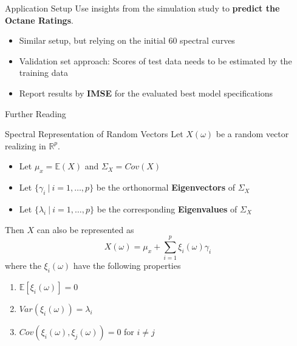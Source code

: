 \documentclass{beamer}
\begin{document}
	\begin{frame}{Application Setup}
	Use insights from the simulation study to \textbf{predict the Octane Ratings}.
	\vspace{0.4cm}
		\begin{itemize}
			\item Similar setup, but relying on the initial 60 spectral curves
			\item Validation set approach:	Scores of test data needs to be estimated by the training data
			\item Report results by \textbf{IMSE} for the evaluated best model specifications
		\end{itemize}
	\end{frame}
	
	\begin{frame}{Further Reading}
		\nocite{hsing_theoretical_2015}
		\nocite{kokoszka_introduction_2017}
		\nocite{Bohacs_Ovadi_Salgo1998}
		\nocite{FR_li_et_al_2020} 
		\nocite{Reiss_2007b}
		\nocite{ramsay_functional_2005}
		\AtNextBibliography{\tiny}
		\printbibliography[heading=none]
	\end{frame}
	
	
	\begin{frame}{Spectral Representation of Random Vectors}\label{spectral}
		Let $X(\omega)$ be a random vector realizing in $\mathbb{R}^p$.
		
		\begin{itemize}
			\item Let $\mu_x = \mathbb{E}(X)$ and $\Sigma_X = Cov(X)$
			\item Let $\{\gamma_i \: \vert \: i = 1, \dots, p\}$ be the orthonormal \textbf{Eigenvectors} of $\Sigma_X$
			\item Let $\{\lambda_i \: \vert \: i = 1, \dots, p\}$ be the corresponding \textbf{Eigenvalues} of $\Sigma_X$
		\end{itemize}
		
		\vspace{0.2cm}
		Then $X$ can also be represented as
		$$X(\omega) = \mu_x + \sum_{i = 1}^{p} \xi_i(\omega) \gamma_i$$
		where the $\xi_i(\omega)$ have the following properties
		
		\begin{multicols}{2}
			\begin{enumerate}
				\item $\mathbb{E}[\xi_i(\omega)] = 0$
				\item $Var(\xi_i(\omega)) = \lambda_i$
				\item $Cov(\xi_i(\omega), \xi_j(\omega)) = 0$ for $i \neq j$
			\end{enumerate}
		\end{multicols}
	
		\hyperlink{KLE}{}
	\end{frame}
\end{document}
